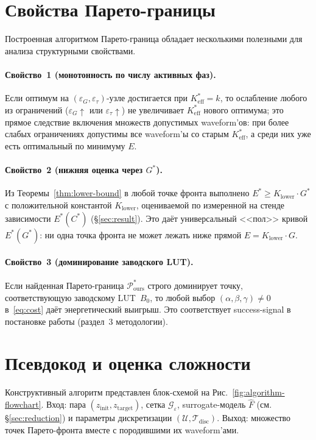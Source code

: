 \section{Свойства Парето-границы}\label{sec:pareto-properties}

Построенная алгоритмом Парето-граница обладает несколькими полезными для
анализа структурными свойствами.

\paragraph{Свойство~1 (монотонность по числу активных фаз).}
Если оптимум на $(\varepsilon_G, \varepsilon_{\tau})$-узле достигается при
$K_{\mathrm{eff}}^{*} = k$, то ослабление любого из ограничений
($\varepsilon_G \uparrow$ или $\varepsilon_{\tau} \uparrow$) не увеличивает
$K_{\mathrm{eff}}^{*}$ нового оптимума; это прямое следствие включения множеств
допустимых waveform'ов: при более слабых ограничениях допустимы все
waveform'ы со старым $K_{\mathrm{eff}}^{*}$, а среди них уже есть оптимальный
по минимуму $E$.

\paragraph{Свойство~2 (нижняя оценка через $G^{*}$).}
Из Теоремы~\ref{thm:lower-bound} в любой точке фронта выполнено
$E^{*} \ge K_{\mathrm{lower}} \cdot G^{*}$ с положительной константой
$K_{\mathrm{lower}}$, оцениваемой по измеренной на стенде зависимости
$E^{*}(C^{*})$ (\S\ref{sec:result}). Это даёт универсальный <<пол>> кривой
$E^{*}(G^{*})$: ни одна точка фронта не может лежать ниже прямой
$E = K_{\mathrm{lower}} \cdot G$.

\paragraph{Свойство~3 (доминирование заводского LUT).}
Если найденная Парето-граница $\mathcal{P}^{*}_{\mathrm{ours}}$ строго
доминирует точку, соответствующую заводскому LUT~$B_0$, то любой выбор
$(\alpha, \beta, \gamma) \ne 0$ в~\eqref{eq:cost} даёт энергетический
выигрыш. Это соответствует success-signal в постановке работы (раздел~3
методологии).


\section{Псевдокод и оценка сложности}\label{sec:algorithm-complexity}

Конструктивный алгоритм представлен блок-схемой на
Рис.~\ref{fig:algorithm-flowchart}. Вход: пара
$(z_{\mathrm{init}}, z_{\mathrm{target}})$, сетка $\mathcal{G}_{\varepsilon}$,
surrogate-модель $\widehat{F}$ (см. \S\ref{sec:reduction}) и параметры
дискретизации $(\mathcal{U}, \mathcal{T}_{\mathrm{disc}})$. Выход: множество
точек Парето-фронта вместе с породившими их waveform'ами.

